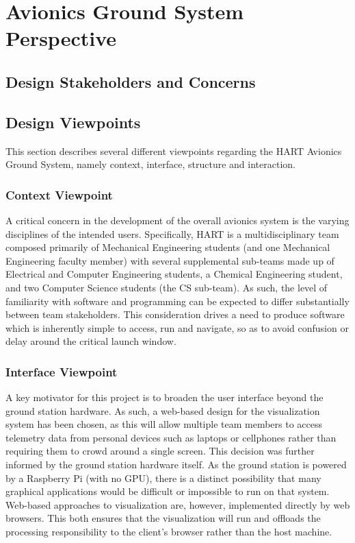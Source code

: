 \documentclass[journal,10pt,onecolumn,compsoc]{IEEEtran}
\begin{document}
\newpage


\section{Avionics Ground System Perspective}

	\subsection{Design Stakeholders and Concerns}
		\noindent %

	\subsection{Design Viewpoints}
		\noindent This section describes several different viewpoints regarding the HART Avionics Ground System, namely context, interface, structure and interaction.

		\subsubsection{Context Viewpoint}
			\noindent A critical concern in the development of the overall avionics system is the varying disciplines of the intended users. 
			Specifically, HART is a multidisciplinary team composed primarily of Mechanical Engineering students (and one Mechanical Engineering faculty member) with several supplemental sub-teams made up of Electrical and Computer Engineering students, a Chemical Engineering student, and two Computer Science students (the CS sub-team).
			As such, the level of familiarity with software and programming can be expected to differ substantially between team stakeholders.
			This consideration drives a need to produce software which is inherently simple to access, run and navigate, so as to avoid confusion or delay around the critical launch window. 

		\subsubsection{Interface Viewpoint}
			\noindent A key motivator for this project is to broaden the user interface beyond the ground station hardware.
			As such, a web-based design for the visualization system has been chosen, as this will allow multiple team members to access telemetry data from personal devices such as laptops or cellphones rather than requiring them to crowd around a single screen.
			This decision was further informed by the ground station hardware itself.
			As the ground station is powered by a Raspberry Pi (with no GPU), there is a distinct possibility that many graphical applications would be difficult or impossible to run on that system.
			Web-based approaches to visualization are, however, implemented directly by web browsers.
			This both ensures that the visualization will run and offloads the processing responsibility to the client's browser rather than the host machine.  
\end{document}
